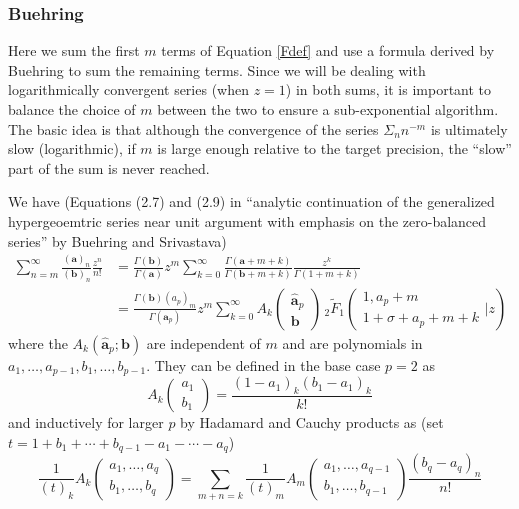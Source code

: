 \documentclass[12pt]{article}
\numberwithin{equation}{section}
\begin{document}
\subsubsection{Buehring}
Here we sum the first $m$ terms of Equation \eqref{Fdef} and use a formula derived by Buehring to sum the remaining terms. Since we will be dealing with logarithmically convergent series (when $z=1$) in both sums, it is important to balance the choice of $m$ between the two to ensure a sub-exponential algorithm. The basic idea is that although the convergence of the series $\Sigma_n n^{-m}$ is ultimately slow (logarithmic), if $m$ is large enough relative to the target precision, the ``slow'' part of the sum is never reached.

We have (Equations (2.7) and (2.9) in ``analytic continuation of the generalized hypergeoemtric series near unit argument with emphasis on the zero-balanced series'' by Buehring and Srivastava)
\begin{align}
\nonumber
\sum_{n=m}^{\infty}{\frac{(\mathbf{a})_n}{(\mathbf{b})_n} \frac{z^n}{n!}}&=\frac{\Gamma(\mathbf{b})}{\Gamma(\mathbf{a})} z^m \sum_{k=0}^{\infty} {\frac{\Gamma(\mathbf{a}+m+k)}{\Gamma(\mathbf{b}+m+k)} \frac{z^k}{\Gamma(1+m+k)}}\\
\label{buehring}
&=\frac{\Gamma(\mathbf{b})(a_p)_m}{\Gamma(\hat{\mathbf{a}}_p)} z^m \sum_{k=0}^{\infty} {A_k\left(\begin{array}{c} \hat{\mathbf{a}}_p \\ \mathbf{b} \end{array}\right)} \,{} _2\tilde{F}_1\left( \begin{array}{c} 1,a_p+m \\ 1+\sigma+a_p+m+k \end{array} \Big| z\right)
\end{align}
where the $A_k(\hat{\mathbf{a}}_p; \mathbf{b})$ are independent of $m$ and are polynomials in $a_1,\dots,a_{p-1},b_1,\dots,b_{p-1}$. They can be defined in the base case $p=2$ as
\begin{equation*}
A_k\left(\begin{array}{c} a_1 \\ b_1 \end{array}\right) = \frac{(1-a_1)_k(b_1-a_1)_k}{k!}
\end{equation*}
and inductively for larger $p$ by Hadamard and Cauchy products as (set $t=1+b_1 + \cdots + b_{q-1} - a_1-\cdots -a_q$)
\begin{equation*}
\frac{1}{(t)_k}A_k\left(\begin{array}{c}a_1,\dots,a_q\\b_1,\dots,b_q\end{array}\right) = \sum_{m+n=k} \frac{1}{(t)_m}A_m\left(\begin{array}{c}a_1,\dots,a_{q-1}\\b_1,\dots,b_{q-1}\end{array}\right) \frac{(b_q-a_q)_n}{n!}
\end{equation*}
\end{document}
